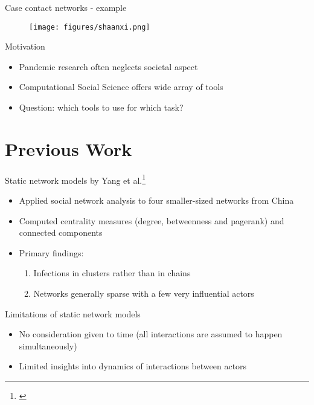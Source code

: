 \documentclass{beamer}
\begin{document}
	\begin{frame}{Case contact networks - example}
		\begin{figure}
			\texttt{[image: figures/shaanxi.png]}
		\end{figure}
	\end{frame}

	\begin{frame}{Motivation}
		\begin{itemize}
			\item Pandemic research often neglects societal aspect
			\item Computational Social Science offers wide array of tools 
			\item Question: which tools to use for which task?
		\end{itemize}
	\end{frame}

	\section{Previous Work}
	
	\begin{frame}{Static network models by Yang et al.\footnote{\cite{hainan_publication,shaanxi_publication,xian_publication}}}
		\begin{itemize}
			\item Applied social network analysis to four smaller-sized networks from China
			\item Computed centrality measures (degree, betweenness and pagerank) and connected components
			\item Primary findings:
			\begin{enumerate}
				\item Infections in clusters rather than in chains
				\item Networks generally sparse with a few very influential actors
			\end{enumerate}
		\end{itemize}
		
	\end{frame}

	\begin{frame}{Limitations of static network models}
		\begin{itemize}
			\item No consideration given to time (all interactions are assumed to happen simultaneously)
			\item Limited insights into dynamics of interactions between actors
		\end{itemize}
	\end{frame}
\end{document}
